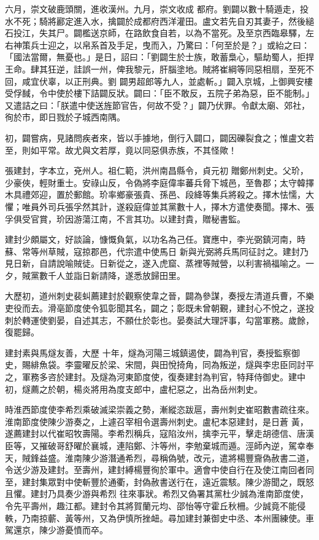 \begin{pinyinscope}
 六月，崇文破鹿頭關，進收漢州。九月，崇文收成
 都府。劉闢以數十騎遁走，投水不死；騎將酈定進入水，擒闢於成都府西洋灌田。盧文若先自刃其妻子，然後縋石投江，失其尸。闢檻送京師，在路飲食自若，以為不當死。及至京西臨皋驛，左右神策兵士迎之，以帛系首及手足，曳而入，乃驚曰：「何至於是？」或紿之曰：「國法當爾，無憂也。」是日，詔曰：「劉闢生於士族，敢蓄梟心，驅劫蜀人，拒捍王命。肆其狂逆，詿誤一州，俾我黎元，肝腦塗地。賊將崔綱等同惡相扇，至死不回，咸宜伏辜，以正刑典。劉
 闢男超郎等九人，並處斬。」闢入京城，上御興安樓受俘馘，令中使於樓下詰闢反狀。闢曰：「臣不敢反，五院子弟為惡，臣不能制。」又遣詰之曰：「朕遣中使送旌節官告，何故不受？」闢乃伏罪。令獻太廟、郊社，徇於市，即日戮於子城西南隅。



 初，闢嘗病，見諸問疾者來，皆以手據地，倒行入闢口，闢因礫裂食之；惟盧文若至，則如平常。故尤與文若厚，竟以同惡俱赤族，不其怪歟！



 張建封，字本立，兗州人。祖仁範，洪州南昌縣令，貞元初
 贈鄭州刺史。父玠，少豪俠，輕財重士。安祿山反，令偽將李庭偉率蕃兵脅下城邑，至魯郡；太守韓擇木具禮郊迎，置於郵館。玠率鄉豪張貴、孫邑、段絳等集兵將殺之。擇木怯懦，大懼；唯員外司兵張孚然其計，遂殺庭偉並其黨數十人，擇木方遣使奏聞。擇木、張孚俱受官賞，玠因游蕩江南，不言其功。以建封貴，贈秘書監。



 建封少頗屬文，好談論，慷慨負氣，以功名為己任。寶應中，李光弼鎮河南，時蘇、常等州草賊，寇掠郡邑，代宗遣中使馬日
 新與光弼將兵馬同征討之。建封乃見日新，自請說喻賊徒。日新從之，遂入虎窟、蒸裡等賊營，以利害禍福喻之。一夕，賊黨數千人並詣日新請降，遂悉放歸田里。



 大歷初，道州刺史裴虯薦建封於觀察使韋之晉，闢為參謀，奏授左清道兵曹，不樂吏役而去。滑亳節度使令狐彰聞其名，闢之；彰既未曾朝覲，建封心不悅之，遂投刺於轉運使劉晏，自述其志，不願仕於彰也。晏奏試大理評事，勾當軍務。歲餘，復罷歸。



 建封素與馬燧友善，大歷
 十年，燧為河陽三城鎮遏使，闢為判官，奏授監察御史，賜緋魚袋。李靈曜反於梁、宋間，與田悅掎角，同為叛逆，燧與李忠臣同討平之，軍務多咨於建封。及燧為河東節度使，復奏建封為判官，特拜侍御史。建中初，燧薦之於朝，楊炎將用為度支郎中，盧杞惡之，出為岳州刺史。



 時淮西節度使李希烈乘破滅梁崇義之勢，漸縱恣跋扈，壽州刺史崔昭數書疏往來。淮南節度使陳少游奏之，上遽召宰相令選壽州刺史。盧杞本惡建封，是日蒼
 黃，遂薦建封以代崔昭牧壽陽。李希烈稱兵，寇陷汝州，擒李元平，擊走胡德信、唐漢臣等，又摧破哥舒曜於襄城，連陷鄭、汴等州，李勉棄城而遁。涇師內逆，駕幸奉天，賊鋒益盛。淮南陳少游潛通希烈，尋稱偽號，改元，遣將楊豐齎偽赦書二道，令送少游及建封。至壽州，建封縛楊豐徇於軍中。適會中使自行在及使江南回者同至，建封集眾對中使斬豐於通衢，封偽赦書送行在，遠近震駭。陳少游聞之，既怒且懼。建封乃具奏少游與希烈
 往來事狀。希烈又偽署其黨杜少誠為淮南節度使，令先平壽州，趣江都。建封令其將賀蘭元均、邵怡等守霍丘秋柵。少誠竟不能侵軼，乃南掠蘄、黃等州，又為伊慎所挫衄。尋加建封兼御史中丞、本州團練使。車駕還京，陳少游憂憤而卒。




\end{pinyinscope}
